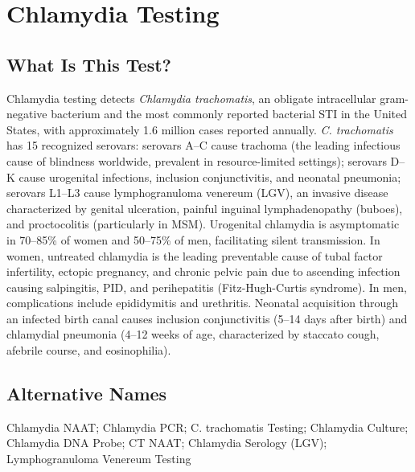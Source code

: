 \chapter{Chlamydia Testing}

\section*{What Is This Test?}
Chlamydia testing detects \textit{Chlamydia trachomatis}, an obligate intracellular gram-negative bacterium and the most commonly reported bacterial STI in the United States, with approximately 1.6 million cases reported annually. \textit{C. trachomatis} has 15 recognized serovars: serovars A--C cause trachoma (the leading infectious cause of blindness worldwide, prevalent in resource-limited settings); serovars D--K cause urogenital infections, inclusion conjunctivitis, and neonatal pneumonia; serovars L1--L3 cause lymphogranuloma venereum (LGV), an invasive disease characterized by genital ulceration, painful inguinal lymphadenopathy (buboes), and proctocolitis (particularly in MSM). Urogenital chlamydia is asymptomatic in 70--85\% of women and 50--75\% of men, facilitating silent transmission. In women, untreated chlamydia is the leading preventable cause of tubal factor infertility, ectopic pregnancy, and chronic pelvic pain due to ascending infection causing salpingitis, PID, and perihepatitis (Fitz-Hugh-Curtis syndrome). In men, complications include epididymitis and urethritis. Neonatal acquisition through an infected birth canal causes inclusion conjunctivitis (5--14 days after birth) and chlamydial pneumonia (4--12 weeks of age, characterized by staccato cough, afebrile course, and eosinophilia).

\section*{Alternative Names}
Chlamydia NAAT; Chlamydia PCR; C. trachomatis Testing; Chlamydia Culture; Chlamydia DNA Probe; CT NAAT; Chlamydia Serology (LGV); Lymphogranuloma Venereum Testing

